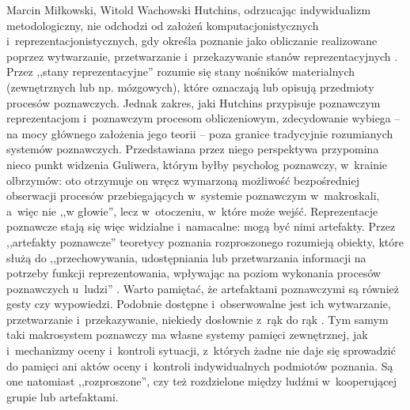 \begin{artplenv2auth}{Marcin Miłkowski, Witold Wachowski}
Hutchins, odrzucając indywidualizm metodologiczny, nie odchodzi od założeń komputacjonistycznych i~reprezentacjonistycznych, gdy określa poznanie jako obliczanie realizowane poprzez wytwarzanie, przetwarzanie i~przekazywanie stanów reprezentacyjnych
\parencite[][s.~49]{hutchins_cognition_1995}. %
 Przez ,,stany reprezentacyjne'' rozumie się stany nośników materialnych (zewnętrznych lub np. mózgowych), które oznaczają lub opisują przedmioty procesów poznawczych. Jednak zakres, jaki Hutchins przypisuje poznawczym reprezentacjom i~poznawczym procesom obliczeniowym, zdecydowanie wybiega -- na mocy głównego założenia jego teorii -- poza granice tradycyjnie rozumianych systemów poznawczych. Przedstawiana przez niego perspektywa przypomina nieco punkt widzenia Guliwera, którym byłby psycholog poznawczy, w~krainie olbrzymów: oto otrzymuje on wręcz wymarzoną możliwość bezpośredniej obserwacji procesów przebiegających w~systemie poznawczym w~makroskali, a~więc nie ,,w głowie'', lecz w~otoczeniu, w~które może wejść. Reprezentacje poznawcze stają się więc widzialne i~namacalne: mogą być nimi artefakty. Przez ,,artefakty poznawcze'' teoretycy poznania rozproszonego rozumieją obiekty, które służą do ,,przechowywania, udostępniania lub przetwarzania informacji na potrzeby funkcji reprezentowania, wpływając na poziom wykonania procesów poznawczych u~ludzi'' 
\parencite[][s.~11]{norman_cognitive_1991}. %
 Warto pamiętać, że artefaktami poznawczymi są również gesty czy wypowiedzi. Podobnie dostępne i~obserwowalne jest ich wytwarzanie, przetwarzanie i~przekazywanie, niekiedy dosłownie z~rąk do rąk 
\parencite[][s.~128–129]{hutchins_cognition_1995}. %
 Tym samym taki makrosystem poznawczy ma własne systemy pamięci zewnętrznej, jak i~mechanizmy oceny i~kontroli sytuacji, z~których żadne nie daje się sprowadzić do pamięci ani aktów oceny i~kontroli indywidualnych podmiotów poznania. Są one natomiast ,,rozproszone'', czy też rozdzielone między ludźmi w~kooperującej grupie lub artefaktami.


\end{artplenv2auth}
